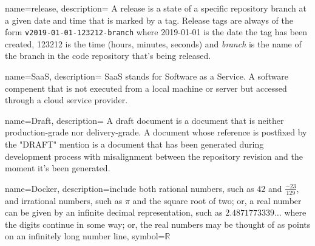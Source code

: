 {
    name={release},
    description={
        A release is a state of a specific repository branch at a given date and time that is marked by a tag.
        Release tags are always of the form \texttt{v2019-01-01-123212-branch} where 2019-01-01 is the date
        the tag has been created, 123212 is the time (hours, minutes, seconds) and \emph{branch} is the name
        of the branch in the code repository that's being released.
    }
}

{
    name={SaaS},
    description={
        SaaS stands for Software as a Service.
        A software compenent that is not executed from a local machine or server
        but accessed through a cloud service provider.
    }
}

{
    name={Draft},
    description={
        A draft document is a document that is neither production-grade nor
        delivery-grade. A document whose reference is postfixed by the "\-DRAFT"
        mention is a document that has been generated during development process
        with misalignment between the repository revision and the moment it's been
        generated.
    }
}


{
  name={Docker},
  description={include both rational numbers, such as $42$ and
               $\frac{-23}{129}$, and irrational numbers,
               such as $\pi$ and the square root of two; or,
               a real number can be given by an infinite decimal
               representation, such as $2.4871773339\ldots$ where
               the digits continue in some way; or, the real
               numbers may be thought of as points on an infinitely
               long number line},
  symbol={\ensuremath{\mathbb{R}}}
}
